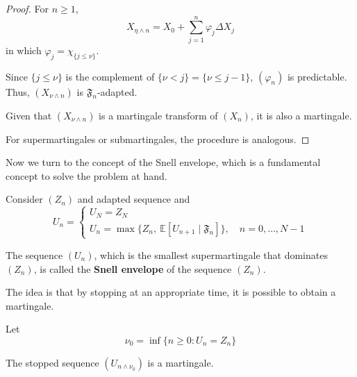 \begin{proof}
    For $n\ge 1$,
    \[
        X_{\eta \wedge n} = X_0 + \sum_{j=1}^{n} \varphi_j \Delta X_j
    \]
    in which $\varphi_j = \chi_{\{ j \le \nu \}}$.
    
    Since $\{ j \le \nu \}$ is the complement of $\{\nu < j \} = \{\nu \le j - 1\}$, $(\varphi_n)$ is predictable. Thus, $(X_{\nu \wedge n})$ is $\mathfrak{F}_n$-adapted. 

    Given that $(X_{\nu \wedge n})$ is a martingale transform of $(X_n)$, it is also a martingale. 

    For supermartingales or submartingales, the procedure is analogous.
\end{proof}

Now we turn to the concept of the Snell envelope, which is a fundamental concept to solve the problem at hand. 

\begin{definition}
    Consider $(Z_n)$ and adapted sequence and 
    \begin{equation*}
        U_n =
        \begin{cases}
        U_N = Z_N \\
        U_n = \max \{ Z_n, ~\mathbb{E}[U_{n+1} \mid \mathfrak{F}_n] \}, \quad n = 0, \ldots, N-1
        \end{cases}
    \end{equation*}

    The sequence $(U_n)$, which is the smallest supermartingale that dominates $(Z_n)$, is called the \textbf{Snell envelope} of the sequence $(Z_n)$. 
\end{definition}

The idea is that by stopping at an appropriate time, it is possible to obtain a martingale.

\begin{proposition}
    Let 
    \[
        \nu_0 = \inf \{ n \ge 0 : U_n = Z_n \}
    \]

    The stopped sequence $(U_{n \wedge \nu_0})$ is a martingale.
\end{proposition}

